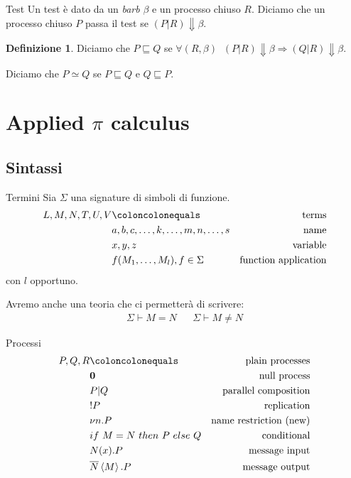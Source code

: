 \documentclass{beamer}
\newcounter{counter1}
\theoremstyle{plain}
\theoremstyle{definition}
\newtheorem{mydef}[counter1]{Definizione}
\theoremstyle{remark}
\newcommand{\obar}[1]{\overline{#1}}
\begin{document}
\begin{frame}{Test}
  Un test è dato da un \textit{barb} $\beta$ e un processo chiuso
  $R$. Diciamo che un processo chiuso $P$ passa il test se $(P|R)
  \Downarrow \beta$.
  \vfill

  \begin{mydef}
    Diciamo che $P \sqsubseteq Q$ se
    $\forall (R,\beta)\;\; (P|R)\Downarrow \beta \Rightarrow
    (Q|R)\Downarrow \beta$.

    Diciamo che $P \simeq Q$ se $P \sqsubseteq Q$ e $Q \sqsubseteq P$.
  \end{mydef}
\end{frame}

\section{Applied $\pi$ calculus}

\subsection{Sintassi}

\begin{frame}{Termini}
  Sia $\Sigma$ una signature di simboli di funzione.  
  \begin{align*}
    L,M,N,T,U,V & \coloncolonequals & \text{terms} \\
                & a,b,c,\dots,k,\dots,m,n,\dots,s & \text{name} \\
                & x,y,z & \text{variable} \\
                & f(M_1,\dots,M_l), f\in \Sigma & \text{function application}
  \end{align*}
  con $l$ opportuno.

  Avremo anche una teoria che ci permetter\`a di scrivere:
  \begin{align*}
    \Sigma \vdash M = N & & \Sigma \vdash M \neq N
  \end{align*}
\end{frame}

\begin{frame}{Processi}
  \begin{align*}
  P,Q,R & \coloncolonequals & \text{plain processes} \\
  & \mathbf{0} & \text{null process} \\
  & P | Q & \text{parallel composition} \\
  & !P & \text{replication} \\
  & \nu n.P & \text{name restriction (new)} \\
  & if\ M=N\ then\ P\ else\ Q & \text{conditional} \\
  & N(x).P & \text{message input} \\
  & \obar{N}\left< M\right> .P & \text{message output}
\end{align*}

\end{frame}
\end{document}
